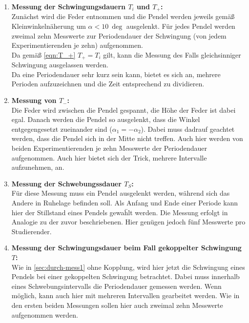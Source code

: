 \begin{enumerate}
	\item \textbf{Messung der Schwingungsdauern $T_i$ und $T_+$:} \\
		Zunächst wird die Feder entnommen und die Pendel werden jeweils gemäß
		Kleinwinkelnäherung um $\alpha < \SI{10}{\deg}$ ausgelenkt. Für jedes
		Pendel werden zweimal zehn Messwerte zur Periodendauer der Schwingung
		(von jedem Experimentierenden je zehn) aufgenommen. \\
		Da gemäß \autoref{eqn:T_+} $T_+ = T_i$ gilt, kann die Messung des Falls
		gleichsinniger Schwingung ausgelassen werden. \\
		Da eine Periodendauer sehr kurz sein kann, bietet es sich an, mehrere
		Perioden aufzuzeichnen und die Zeit entsprechend zu dividieren.
		\label{sec:durch-mess1}
	\item \textbf{Messung von $T_-$:} \\
		Die Feder wird zwischen die Pendel gespannt, die Höhe der Feder ist dabei
		egal. Danach werden die Pendel so ausgelenkt, dass die Winkel 
		entgegengesetzt zueinander sind ($\alpha_1 = -\alpha_2$). Dabei muss
		dadrauf geachtet werden, dass die Pendel sich in der Mitte nicht treffen.
		Auch hier werden von beiden Experimentierenden je zehn Messwerte der
		Periodendauer aufgenommen. Auch hier bietet sich der Trick, mehrere
		Intervalle aufzunehmen, an.
	\item \textbf{Messung der Schwebungssdauer $T_S$:} \\
		Für diese Messung muss ein Pendel ausgelenkt werden, während sich das
		Andere in Ruhelage befinden soll. Als Anfang und Ende einer Periode 
		kann hier der Stillstand eines Pendels gewaḧlt werden. Die Messung erfolgt
		in Analogie zu der zuvor beschriebenen. Hier genügen jedoch fünf Messwerte
		pro Studierender.
	\item \textbf{Messung der Schwingungsdauer beim Fall gekoppelter Schwingung $T$:} \\
		Wie in \autoref{sec:durch-mess1} ohne Kopplung, wird hier jetzt die
		Schwingung eines Pendels bei einer gekoppelten Schwingung betrachtet.
		Dabei muss innerhalb eines Schwebungsintervalls die Periodendauer gemessen
		werden. Wenn möglich, kann auch hier mit mehreren Intervallen gearbeitet
		werden. Wie in den ersten beiden Messungen sollen hier auch zweimal zehn
		Messwerte aufgenommen werden.
\end{enumerate}

